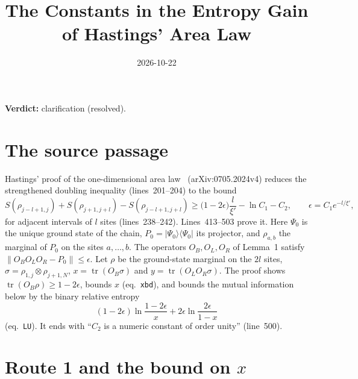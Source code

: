 \documentclass{article}
\title{The Constants in the Entropy Gain of Hastings' Area Law}
\author{}
\date{2026-10-22}
\providecommand{\gapnote}[2]{\par\noindent\textbf{Verdict:} #1 (#2).\par}
\begin{document}
\maketitle
\gapnote{clarification}{resolved}

\section{The source passage}

Hastings' proof of the one-dimensional area law~\cite{Hastings2007AreaLaw}
(arXiv:0705.2024v4) reduces the strengthened doubling inequality
(lines~201--204) to the bound
\begin{equation}\label{eq:relent}
  S(\rho_{j-l+1,j})+S(\rho_{j+1,j+l})-S(\rho_{j-l+1,j+l})
  \ge\bigl(1-2\epsilon\bigr)\frac{l}{\xi'}-\ln C_1-C_2,
  \qquad\epsilon=C_1e^{-l/\xi'},
\end{equation}
for adjacent intervals of $l$ sites (lines~238--242). Lines~413--503 prove it.
Here $\Psi_0$ is the unique ground state of the chain, $P_0=|\Psi_0\rangle
\langle\Psi_0|$ its projector, and $\rho_{a,b}$ the marginal of $P_0$ on the
sites $a,\dots,b$. The operators $O_B,O_L,O_R$ of Lemma~1 satisfy
$\lVert O_BO_LO_R-P_0\rVert\le\epsilon$. Let $\rho$ be the ground-state
marginal on the $2l$ sites, $\sigma=\rho_{1,j}\otimes\rho_{j+1,N}$,
$x=\operatorname{tr}(O_B\sigma)$ and $y=\operatorname{tr}(O_LO_R\sigma)$.
The proof shows $\operatorname{tr}(O_B\rho)\ge1-2\epsilon$, bounds $x$
(eq.~\texttt{xbd}), and bounds the mutual information below by the binary
relative entropy
\begin{equation}\label{eq:LU}
  (1-2\epsilon)\ln\frac{1-2\epsilon}{x}+2\epsilon\ln\frac{2\epsilon}{1-x}
\end{equation}
(eq.~\texttt{LU}). It ends with ``$C_2$ is a numeric constant of order unity''
(line~500).

\section{Route 1 and the bound on $x$}
\end{document}
